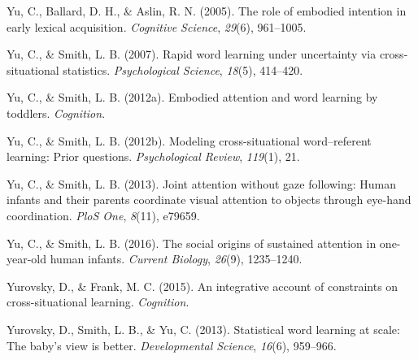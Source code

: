 \documentclass[oneside]{report}
\begin{document}
\leavevmode\hypertarget{ref-yu2005role}{}%
Yu, C., Ballard, D. H., \& Aslin, R. N. (2005). The role of embodied
intention in early lexical acquisition. \emph{Cognitive Science},
\emph{29}(6), 961--1005.

\leavevmode\hypertarget{ref-yu2007rapid}{}%
Yu, C., \& Smith, L. B. (2007). Rapid word learning under uncertainty
via cross-situational statistics. \emph{Psychological Science},
\emph{18}(5), 414--420.

\leavevmode\hypertarget{ref-yu2012embodied}{}%
Yu, C., \& Smith, L. B. (2012a). Embodied attention and word learning by
toddlers. \emph{Cognition}.

\leavevmode\hypertarget{ref-yu2012modeling}{}%
Yu, C., \& Smith, L. B. (2012b). Modeling cross-situational
word--referent learning: Prior questions. \emph{Psychological Review},
\emph{119}(1), 21.

\leavevmode\hypertarget{ref-yu2013joint}{}%
Yu, C., \& Smith, L. B. (2013). Joint attention without gaze following:
Human infants and their parents coordinate visual attention to objects
through eye-hand coordination. \emph{PloS One}, \emph{8}(11), e79659.

\leavevmode\hypertarget{ref-yu2016social}{}%
Yu, C., \& Smith, L. B. (2016). The social origins of sustained
attention in one-year-old human infants. \emph{Current Biology},
\emph{26}(9), 1235--1240.

\leavevmode\hypertarget{ref-yurovsky2014algorithmic}{}%
Yurovsky, D., \& Frank, M. C. (2015). An integrative account of
constraints on cross-situational learning. \emph{Cognition}.

\leavevmode\hypertarget{ref-yurovsky2013statistical}{}%
Yurovsky, D., Smith, L. B., \& Yu, C. (2013). Statistical word learning
at scale: The baby's view is better. \emph{Developmental Science},
\emph{16}(6), 959--966.


\end{document}
